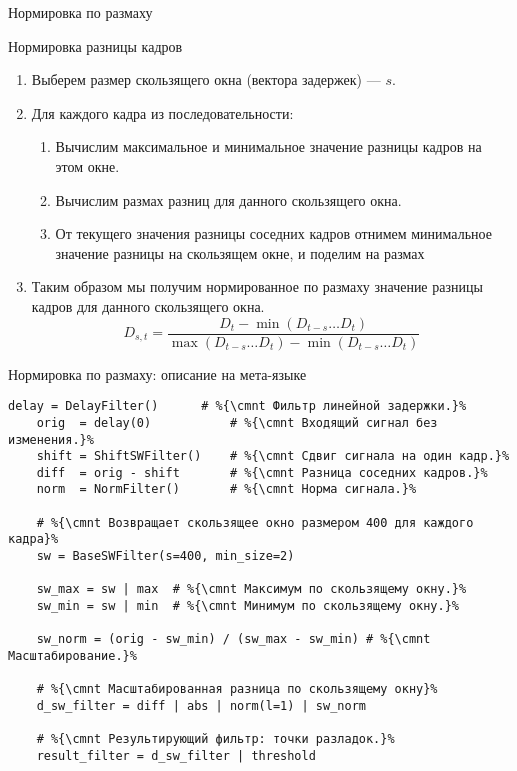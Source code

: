 \begin{frame}{Нормировка по размаху}

    \begin{gray-box}{Нормировка разницы кадров}
        \begin{enumerate}
            \item Выберем размер скользящего окна (вектора задержек) — $s$.
            \item Для каждого кадра из последовательности:
            \begin{enumerate}
                \item Вычислим максимальное и минимальное значение разницы 
                кадров на этом окне.
                \item Вычислим размах разниц для данного скользящего окна.
                \item От текущего значения разницы соседних кадров
                отнимем минимальное значение разницы на скользящем окне,
                и поделим на размах
            \end{enumerate}
            \item Таким образом мы получим нормированное 
            по размаху значение разницы кадров для данного скользящего окна.
            \[
                D_{s,t} = \dfrac
                    {D_{t} - \min \left( D_{t-s} \dots  D_{t} \right)}
                    {\max \left( D_{t-s} \dots  D_{t} \right)
                        - \min \left( D_{t-s} \dots  D_{t} \right)}
            \]  
        \end{enumerate}
    \end{gray-box}
\end{frame}

\begin{frame}[fragile]{Нормировка по размаху: описание на мета-языке}
\begin{lstlisting}[language=FilterPython]
    delay = DelayFilter()      # %{\cmnt Фильтр линейной задержки.}%
    orig  = delay(0)           # %{\cmnt Входящий сигнал без изменения.}%
    shift = ShiftSWFilter()    # %{\cmnt Сдвиг сигнала на один кадр.}%
    diff  = orig - shift       # %{\cmnt Разница соседних кадров.}%
    norm  = NormFilter()       # %{\cmnt Норма сигнала.}%
    
    # %{\cmnt Возвращает скользящее окно размером 400 для каждого кадра}%
    sw = BaseSWFilter(s=400, min_size=2)
    
    sw_max = sw | max  # %{\cmnt Максимум по скользящему окну.}%
    sw_min = sw | min  # %{\cmnt Минимум по скользящему окну.}%
    
    sw_norm = (orig - sw_min) / (sw_max - sw_min) # %{\cmnt Масштабирование.}%
    
    # %{\cmnt Масштабированная разница по скользящему окну}%
    d_sw_filter = diff | abs | norm(l=1) | sw_norm
    
    # %{\cmnt Результирующий фильтр: точки разладок.}%
    result_filter = d_sw_filter | threshold
\end{lstlisting}
\end{frame}


